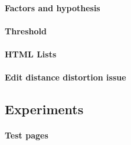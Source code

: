 \documentclass[11pt]{article}
\begin{document}
\paragraph{Factors and hypothesis}

\paragraph{Threshold}

\paragraph{HTML Lists}

\paragraph{Edit distance distortion issue}

\subsection{Experiments}

\paragraph{Test pages}






\end{document}
